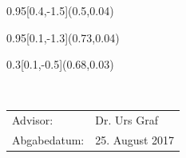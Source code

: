 
\begin{titlepage}
	\setlength{\TPHorizModule}{\paperwidth}
	\setlength{\TPVertModule}{\paperheight}
	
	
	
	\begin{textblock}{0.95}[0.4,-1.5](0.5,0.04)
	\end{textblock}
	\begin{textblock}{0.95}[0.1,-1.3](0.73,0.04)
	\end{textblock}
	\begin{textblock}{0.3}[0.1,-0.5](0.68,0.03)
	\end{textblock}
    \vspace*{8cm}
    \begin{center}
    	\Huge{\color{HeadBlue}{Eine ROS Anbindung für EEROS\\}}
		\vspace*{3cm}
		\normalsize
      	{}\\
		\vspace*{2cm}      	


    \vspace*{3cm}
    \color{HeadBlue}
    \begin{tabular}{p{4cm}l}
      Advisor: & Dr. Urs Graf \\
      Abgabedatum: & 25. August 2017
    \end{tabular}\\
    \end{center}
  \end{titlepage}



